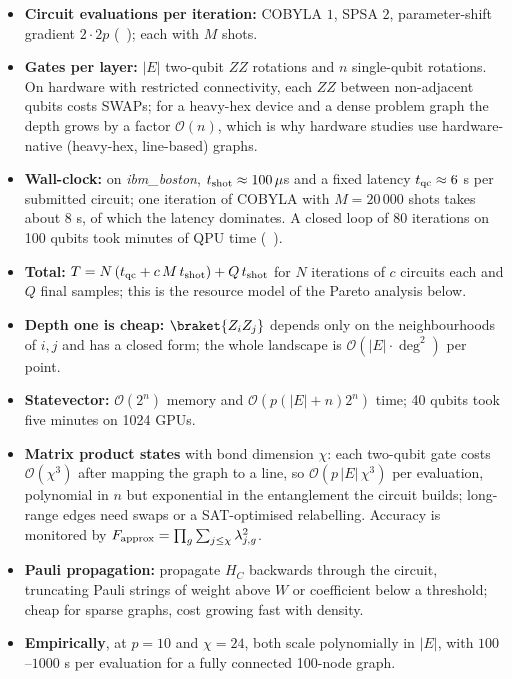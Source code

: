 \documentclass[handoutsbeamer.tex]{subfiles}
\begin{document}
\begin{frame}
\begin{itemize}\setlength\itemsep{0.3em}
    \item \textbf{Circuit evaluations per iteration:} COBYLA $1$, SPSA $2$, parameter-shift gradient $2\cdot 2p$ (\Chap~); each with $M$ shots.
    \item \textbf{Gates per layer:} $|E|$ two-qubit $ZZ$ rotations and $n$ single-qubit rotations. On hardware with restricted connectivity, each $ZZ$ between non-adjacent qubits costs SWAPs; for a heavy-hex device and a dense problem graph the depth grows by a factor $\mathcal O(n)$, which is why hardware studies use hardware-native (heavy-hex, line-based) graphs.
    \item \textbf{Wall-clock:} on \emph{ibm\_boston}, $t_{\rm shot} \approx 100\,\mu$s and a fixed latency $t_{\rm qc} \approx 6$ s per submitted circuit; one iteration of COBYLA with $M = 20\,000$ shots takes about 8 s, of which the latency dominates. A closed loop of 80 iterations on 100 qubits took minutes of QPU time (\Chap~).
    \item \textbf{Total:} $T = N\,(t_{\rm qc} + c\,M\,t_{\rm shot}) + Q\,t_{\rm shot}$ for $N$ iterations of $c$ circuits each and $Q$ final samples; this is the resource model of the Pareto analysis below.
\end{itemize}
\end{frame}

\begin{frame}
\begin{itemize}\setlength\itemsep{0.3em}
    \item \textbf{Depth one is cheap:} $\braket{Z_iZ_j}$ depends only on the neighbourhoods of $i,j$ and has a closed form; the whole landscape is $\mathcal O(|E|\cdot\deg^2)$ per point.
    \item \textbf{Statevector:} $\mathcal O(2^n)$ memory and $\mathcal O(p(|E|+n)2^n)$ time; 40 qubits took five minutes on 1024 GPUs.
    \item \textbf{Matrix product states} with bond dimension $\chi$: each two-qubit gate costs $\mathcal O(\chi^3)$ after mapping the graph to a line, so $\mathcal O(p\,|E|\,\chi^3)$ per evaluation, polynomial in $n$ but exponential in the entanglement the circuit builds; long-range edges need swaps or a SAT-optimised relabelling. Accuracy is monitored by $F_{\rm approx} = \prod_g\sum_{j\le\chi}\lambda_{j,g}^2$.
    \item \textbf{Pauli propagation:} propagate $H_C$ backwards through the circuit, truncating Pauli strings of weight above $W$ or coefficient below a threshold; cheap for sparse graphs, cost growing fast with density.
    \item \textbf{Empirically}, at $p = 10$ and $\chi = 24$, both scale polynomially in $|E|$, with $100$--$1000$ s per evaluation for a fully connected 100-node graph.
\end{itemize}
\end{frame}
\end{document}
